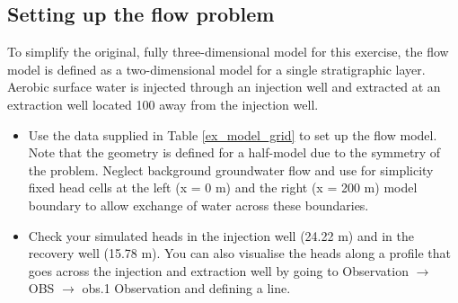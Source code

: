 \subsection[Setting up the flow problem]{Setting up the flow problem}

To simplify the original, fully three-dimensional model for this exercise, 
the flow model is defined as a two-dimensional model for a single stratigraphic layer. Aerobic surface water is injected through an injection well and extracted 
at an extraction well located 100 away from the injection well. 

\begin{itemize}

\item Use the data supplied in Table \ref{ex_model_grid} to set up the flow model. 
Note that the geometry is defined for a half-model due to the symmetry of the problem.
Neglect background groundwater flow and use for simplicity fixed head cells at the left 
(x = 0 m) and the right (x = 200 m) model boundary to allow 
exchange of water across these boundaries.

\item Check your simulated heads in the injection well (24.22 m) and in the recovery well (15.78 m).
You can also visualise the heads along a profile that goes across the injection and extraction well
by going to
{\color{blue}Observation} $\rightarrow$ {\color{blue}OBS} $\rightarrow$ {\color{blue}obs.1 Observation} 
and defining a line. 

\end{itemize}

